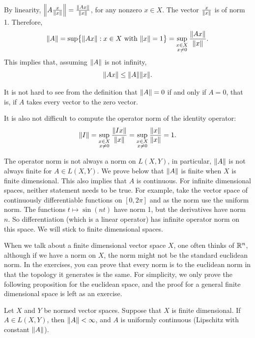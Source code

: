 By linearity,
$\left\lVert {A \frac{x}{\lVert {x} \rVert}} \right\rVert = \frac{\lVert {Ax} \rVert}{\lVert {x} \rVert}$,
for any nonzero $x \in X$.
The vector $\frac{x}{\lVert {x} \rVert}$ is of norm 1.
Therefore,
\begin{equation*}
\lVert {A} \rVert =
\sup \bigl\{ \lVert {Ax} \rVert : x \in X \text{ with } \lVert {x} \rVert = 1 \bigr\}
=
\sup_{\substack{x \in X\\x\neq 0}} \frac{\lVert {Ax} \rVert}{\lVert {x} \rVert} .
\end{equation*}
This implies that, assuming $\lVert {A} \rVert$ is not infinity,
\begin{equation*}
\lVert {Ax} \rVert \leq \lVert {A} \rVert  \lVert {x} \rVert .
\end{equation*}

It is not hard to see from the definition that $\lVert {A} \rVert = 0$ if and
only if $A = 0$, that is, if $A$ takes every vector to the zero vector.

It is also not difficult to compute the operator norm of the identity operator:
\begin{equation*}
\lVert {I} \rVert =
\sup_{\substack{x \in X\\x\neq 0}} \frac{\lVert {Ix} \rVert}{\lVert {x} \rVert} 
=
\sup_{\substack{x \in X\\x\neq 0}} \frac{\lVert {x} \rVert}{\lVert {x} \rVert} 
= 1.
\end{equation*}

The operator norm is not always a norm on $L(X,Y)$, in particular,
$\lVert {A} \rVert$ is not always finite for $A \in L(X,Y)$.
We prove below that $\lVert {A} \rVert$ is finite when $X$ is finite dimensional.
This also implies that $A$ is continuous.
For infinite dimensional spaces, neither statement needs to be true.
For example,
take the vector space of continuously differentiable functions on $[0,2\pi]$
and as the norm use the uniform norm.  The functions
$t \mapsto \sin(n t)$ have norm 1, but the derivatives have norm $n$.  So
differentiation (which is a linear operator) has infinite operator norm on this
space.  We will stick to finite dimensional spaces.

When we talk about a finite dimensional vector space $X$, one often thinks of
${\mathbb{R}}^n$, although if we have a norm on $X$, the norm might not be
the standard euclidean norm.  In the exercises, you can prove that
every norm is  to the euclidean norm in that the
topology it generates is the same.  For simplicity, we only prove the
following proposition for the euclidean space, and the proof for a general
finite dimensional space is left as an exercise.

\begin{prop} \label{prop:finitedimpropnormfin}
Let $X$ and $Y$ be normed vector spaces.
Suppose that $X$ is finite dimensional.
If $A \in L(X,Y)$, then $\lVert {A} \rVert < \infty$, and
$A$ is uniformly continuous (Lipschitz with constant $\lVert {A} \rVert$).
\end{prop}

